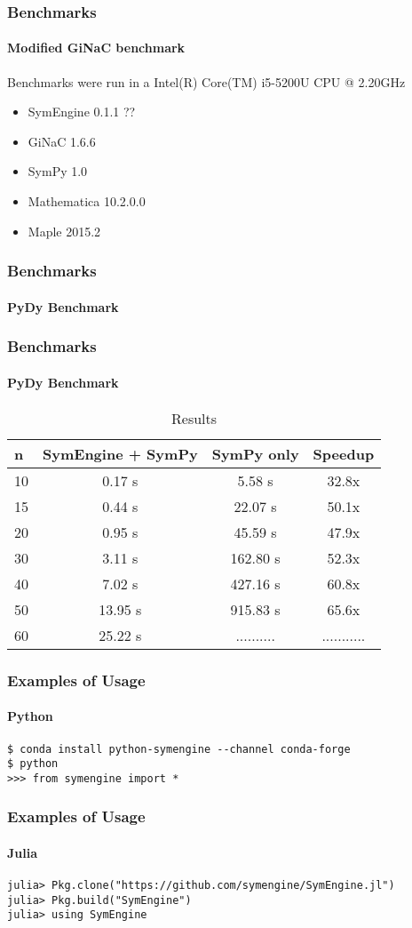 \documentclass{beamer}
\begin{document}
\begin{frame}
\frametitle{Benchmarks}
\framesubtitle{Modified GiNaC benchmark}
Benchmarks were run in a Intel(R) Core(TM) i5-5200U CPU @ 2.20GHz
\begin{itemize}
 \item SymEngine 0.1.1 ??
 \item GiNaC 1.6.6
 \item SymPy 1.0
 \item Mathematica 10.2.0.0
 \item Maple 2015.2
\end{itemize}
\end{frame}


\begin{frame}
\frametitle{Benchmarks}
\framesubtitle{PyDy Benchmark}
\end{frame}


\begin{frame}
\frametitle{Benchmarks}
\framesubtitle{PyDy Benchmark}
\begin{table}
\begin{tabular}{l | c | c | c  }
n & SymEngine + SymPy & SymPy only & Speedup\\
\hline \hline
10 & 0.17 s & 5.58 s & 32.8x \\
15 & 0.44 s & 22.07 s & 50.1x \\
20 & 0.95 s & 45.59 s & 47.9x \\
30 & 3.11 s & 162.80 s & 52.3x \\
40 & 7.02 s & 427.16 s & 60.8x \\
50 & 13.95 s & 915.83 s & 65.6x \\
60 & 25.22 s & .......... & ...........
\end{tabular}
\caption{Results}
\end{table}
\end{frame}

\begin{frame}[fragile]
\frametitle{Examples of Usage}
\framesubtitle{Python}

\begin{verbatim}
$ conda install python-symengine --channel conda-forge
$ python
>>> from symengine import *
\end{verbatim}
\end{frame}


\begin{frame}[fragile]
\frametitle{Examples of Usage}
\framesubtitle{Julia}

\begin{verbatim}
julia> Pkg.clone("https://github.com/symengine/SymEngine.jl")
julia> Pkg.build("SymEngine")
julia> using SymEngine
\end{verbatim}
\end{frame}
\end{document}
